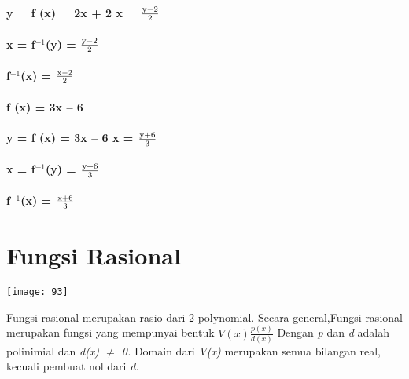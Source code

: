 \documentclass[11pt,fleqn]{book} %
\begin{document}
\paragraph{y = f (x) = 2x + 2   x = $\frac{{\rm y}-2}{2} $}


\paragraph{x = f${}^{-1}$(y) = $\frac{{\rm y}-2}{2} $}

\noindent 
\paragraph{f${}^{-1}$(x) = $\frac{{\rm x}-2}{2} $ }


\paragraph{ f (x) = 3x -- 6 }

\noindent 
\paragraph{y = f (x) = 3x -- 6   x = $\frac{{\rm y}+6}{3} $}

\noindent 
\paragraph{x = f${}^{-1}$(y) = $\frac{{\rm y}+6}{3} $}

\noindent 
\paragraph{f${}^{-1}$(x) = $\frac{{\rm x}+6}{3} $   }

\noindent 

\noindent

\section{Fungsi Rasional}

\begin{center}
\texttt{[image: 93]}
\end{center}

\noindent \textbf{}

Fungsi rasional merupakan rasio dari 2 polynomial. Secara general,Fungsi rasional merupakan fungsi yang mempunyai bentuk $V(x)\frac{p(x)}{d(x)}$ Dengan \textit{p }dan \textit{d }adalah polinimial dan \textit{d(x) $\neq$ 0. }Domain dari\textit{ V(x) }merupakan semua bilangan real, kecuali pembuat nol dari\textit{ d.} 
\end{document}
